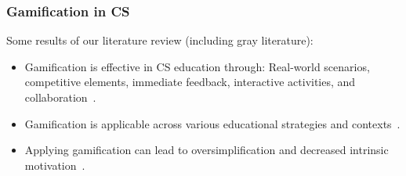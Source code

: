 \documentclass[aspectratio=169]{beamer}
\begin{document}
\begin{frame}%
    \frametitle{Gamification in CS}
    Some results of our literature review (including gray literature):
    \begin{itemize}
        \item Gamification is effective in CS education through: Real-world scenarios, competitive elements, immediate feedback, interactive activities, and collaboration~\cite{8658524}.
        \item Gamification is applicable across various educational strategies and contexts~\cite{informatics9040075, hirsh2022, Tan_Chong_2023}.%
        \item Applying gamification can lead to oversimplification and decreased intrinsic motivation~\cite{8658524}.
    \end{itemize}
\end{frame}
\end{document}

